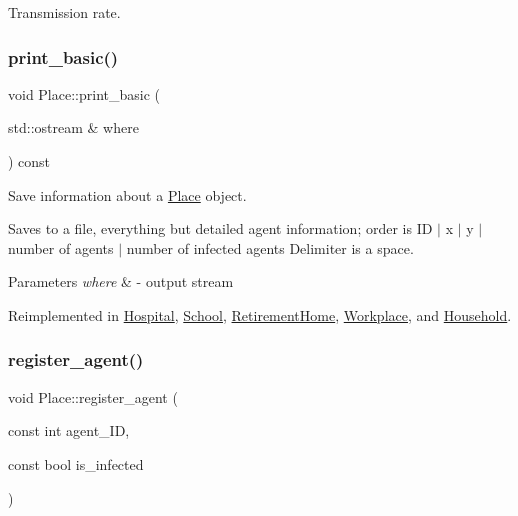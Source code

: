 Transmission rate. 

\mbox{\label{classPlace_a9aa7649e0b91c5f61a5f71e9ca808fe1}} 
\subsubsection{\texorpdfstring{print\+\_\+basic()}{print\_basic()}}
{\footnotesize\ttfamily void Place\+::print\+\_\+basic (\begin{DoxyParamCaption}\item[{std\+::ostream \&}]{where }\end{DoxyParamCaption}) const\hspace{0.3cm}{\ttfamily [virtual]}}



Save information about a \hyperlink{classPlace}{Place} object. 

Saves to a file, everything but detailed agent information; order is ID $\vert$ x $\vert$ y $\vert$ number of agents $\vert$ number of infected agents Delimiter is a space. 
\begin{DoxyParams}{Parameters}
{\em where} & -\/ output stream \\
\hline
\end{DoxyParams}


Reimplemented in \hyperlink{classHospital_a3a1963886a9974663c2a3e82817f1a2b}{Hospital}, \hyperlink{classSchool_ade1610f7c072eb041f6d8b0e157e1cc8}{School}, \hyperlink{classRetirementHome_aafab41675600b03fdffcf11db1a07ec7}{Retirement\+Home}, \hyperlink{classWorkplace_af4fcc642e32e174bab45def56b7c6f05}{Workplace}, and \hyperlink{classHousehold_a9bf27cca25dea519945c8740b9793ff6}{Household}.

\mbox{\label{classPlace_a2e46294c2fd0e871740e3ddab1095296}} 
\subsubsection{\texorpdfstring{register\+\_\+agent()}{register\_agent()}}
{\footnotesize\ttfamily void Place\+::register\+\_\+agent (\begin{DoxyParamCaption}\item[{const int}]{agent\+\_\+\+ID,  }\item[{const bool}]{is\+\_\+infected }\end{DoxyParamCaption})}



